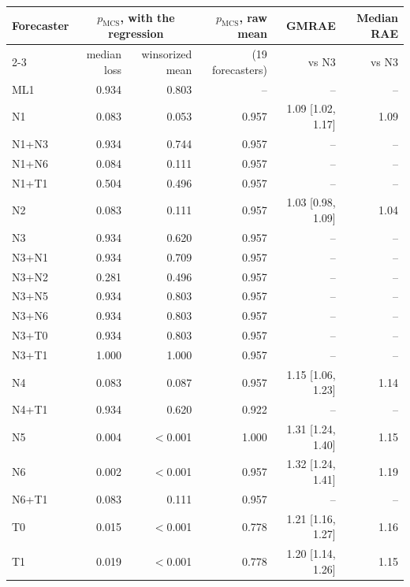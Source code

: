 \begin{tabular}{lrrrrr}
\toprule
Forecaster & \multicolumn{2}{c}{$p_{\mathrm{MCS}}$, with the regression} & $p_{\mathrm{MCS}}$, raw mean & GMRAE & Median RAE \\
\cmidrule(lr){2-3}
 & median loss & winsorized mean & (19 forecasters) & vs N3 & vs N3 \\
\midrule
ML1 & 0.934 & 0.803 & -- & -- & -- \\
N1 & 0.083 & 0.053 & 0.957 & 1.09 [1.02, 1.17] & 1.09 \\
N1+N3 & 0.934 & 0.744 & 0.957 & -- & -- \\
N1+N6 & 0.084 & 0.111 & 0.957 & -- & -- \\
N1+T1 & 0.504 & 0.496 & 0.957 & -- & -- \\
N2 & 0.083 & 0.111 & 0.957 & 1.03 [0.98, 1.09] & 1.04 \\
N3 & 0.934 & 0.620 & 0.957 & -- & -- \\
N3+N1 & 0.934 & 0.709 & 0.957 & -- & -- \\
N3+N2 & 0.281 & 0.496 & 0.957 & -- & -- \\
N3+N5 & 0.934 & 0.803 & 0.957 & -- & -- \\
N3+N6 & 0.934 & 0.803 & 0.957 & -- & -- \\
N3+T0 & 0.934 & 0.803 & 0.957 & -- & -- \\
N3+T1 & 1.000 & 1.000 & 0.957 & -- & -- \\
N4 & 0.083 & 0.087 & 0.957 & 1.15 [1.06, 1.23] & 1.14 \\
N4+T1 & 0.934 & 0.620 & 0.922 & -- & -- \\
N5 & 0.004 & $<$0.001 & 1.000 & 1.31 [1.24, 1.40] & 1.15 \\
N6 & 0.002 & $<$0.001 & 0.957 & 1.32 [1.24, 1.41] & 1.19 \\
N6+T1 & 0.083 & 0.111 & 0.957 & -- & -- \\
T0 & 0.015 & $<$0.001 & 0.778 & 1.21 [1.16, 1.27] & 1.16 \\
T1 & 0.019 & $<$0.001 & 0.778 & 1.20 [1.14, 1.26] & 1.15 \\
\bottomrule
\end{tabular}
